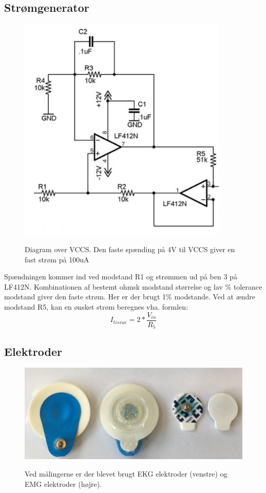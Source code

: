 \subsection{Strømgenerator}

\begin{figure}[H]
\centering
{\includegraphics[width=10cm]
{Figure/howland1}}
\caption{Diagram over VCCS. Den faste spænding på 4V til VCCS giver en fast strøm på 100uA}
\label{fig:howland1}
\end{figure}

Spændningen kommer ind ved modstand R1 og strømmen ud på ben 3 på LF412N. Kombinationen af bestemt ohmsk modstand størrelse og lav \% tolerance modstand giver den faste strøm. Her er der brugt 1\% modstande. Ved at ændre modstand R5, kan en ønsket strøm beregnes vha. formlen\cite{Aroom2009}: $$I_{tissue}=2*\frac{V_{in}}{R_{5}}$$


\subsection{Elektroder}

\begin{figure}[H]
\centering
{\includegraphics[width=12cm]
{Figure/elektroder}}
\caption{Ved målingerne er der blevet brugt EKG elektroder (venstre) og EMG elektroder (højre).}
\label{fig:elektroder}
\end{figure}

